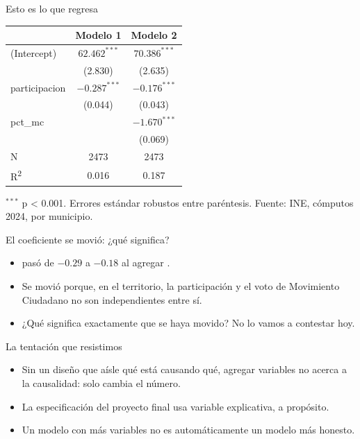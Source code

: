 \begin{frame}{Esto es lo que regresa}
  \vspace{0.2em}
  {\small
  \begin{tabular}{lcc}
    \toprule
     & Modelo 1 & Modelo 2 \\
    \midrule
    (Intercept)     & $62.462^{***}$ & $70.386^{***}$ \\
                     & (2.830)        & (2.635)        \\
    participacion   & $-0.287^{***}$ & $-0.176^{***}$ \\
                     & (0.044)        & (0.043)        \\
    pct\_mc          &                & $-1.670^{***}$ \\
                     &                & (0.069)        \\
    \midrule
    N                & 2473           & 2473           \\
    R\textsuperscript{2} & 0.016     & 0.187          \\
    \bottomrule
  \end{tabular}}

  \vspace{0.6em}
  {\scriptsize\color{grisTenue}$^{***}$ p < 0.001. Errores estándar
  robustos entre paréntesis. Fuente: INE, cómputos 2024, por municipio.}
\end{frame}

\begin{frame}{El coeficiente se movió: ¿qué significa?}
  \vspace{0.3em}
  \begin{itemize}\setlength{\itemsep}{0.9em}
    \item<1->  pasó de $-0.29$ a $-0.18$ al agregar
          .
    \item<2-> Se movió porque, en el territorio, la participación y el voto
          de Movimiento Ciudadano no son independientes entre sí.
    \item<3-> ¿Qué significa exactamente que se haya movido? No lo vamos a
          contestar hoy.
  \end{itemize}
\end{frame}

\begin{frame}{La tentación que resistimos}
  \vspace{0.3em}
  \begin{itemize}\setlength{\itemsep}{0.9em}
    \item<1-> Sin un diseño que aísle qué está causando qué, agregar
          variables no acerca a la causalidad: solo cambia el número.
    \item<2-> La especificación del proyecto final usa 
          variable explicativa, a propósito.
    \item<3-> Un modelo con más variables no es automáticamente un modelo
          más honesto.
  \end{itemize}
\end{frame}

